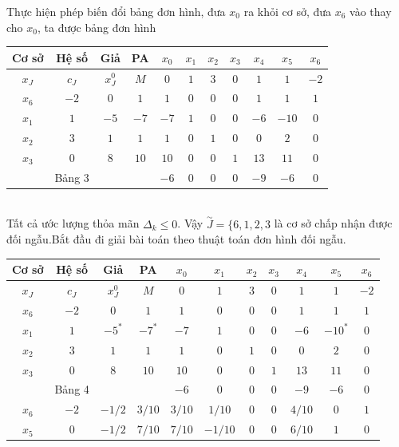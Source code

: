 \documentclass[12pt,a4paper]{report}
\begin{document}
\begin{itemize}
    Thực hiện phép biến đổi bảng đơn hình, đưa $x_0$ ra khỏi cơ sở, đưa $x_6$ vào thay cho $x_0$, ta được bảng đơn hình\\
    \begin{tabular}{|c|c|c|c|c|c|c|c|c|c|c|}
    \hline
         Cơ sở &Hệ số &Giả &PA &$x_0$&$x_1$ & $x_2$ &$x_3$ &$x_4$ & $x_5$ &$x_6$ \\
         \hline
         $x_J$ &$c_J$& $x_J^0$ &$M$ &$0$ &$1$ &$3$ &$0$ &$1$ &$1$ &$-2$\\
         \hline
         $x_6$&$-2$ &$0$ &$1$ &$1$ &$0$ &$0$ &$0$ &$1$ &$1$ &$1$ \\
         $x_1$& $1$ &$-5$ &$-7$ &$-7$ &$1$ &$0$ &$0$ &$-6$ &$-10$ &$0$\\
         $x_2$ &$3$ &$1$ &$1$ &$1$ &$0 $ &$1$ &$0$ &$0$ &$2$ &$0$\\
         $x_3$ &$0$ &$8$ &$10$ &$10$ &$0$ &$0$ &$1$ &$13$ &$11$ &$0$\\
         \hline
         &Bảng 3& &&$-6$ &$0$ &$0$ &$0$ &$-9$ &$-6$ &$0$\\
         \hline
    \end{tabular}\\
    Tất cả ước lượng thỏa mãn $\Delta_k \le 0$. Vậy $\overset{\sim}{J}=\{6,1,2,3$ là cơ sở chấp nhận được đối ngẫu.Bắt đầu đi giải bài toán theo thuật toán đơn hình đối ngẫu.\\
    \begin{tabular}{|c|c|c|c|c|c|c|c|c|c|c|}
    \hline
       Cơ sở   & Hệ số& Giả & PA&$x_0$&$x_1$ & $x_2$ & $x_3$ &$x_4$ &$x_5$ &$x_6$ \\
       \hline
        $x_J$  &$c_J$ &$x_J^0$ &$M$ &$0$ &$1$ &$3$ &$0$ &$1$ &$1$ &$-2$\\
        \hline
        $x_6$ &$-2$ &$0$ &$1$ &$1$ &$0$ &$0$ &$0$ &$1$ &$1$ &$1$\\
        $x_1$ &$1$ & $-5^*$ &$ -7^*$ &$-7$ & $1$ &$0$ &$0$ &$-6$ &$-10^*$ &$0$\\
        $x_2$ &$3$ &$1$ &$1$ &$1$  &$0$ &$1$ &$0$ &$0$ &$2$ &$0$\\
        $x_3$ &$0$ &$8$ &$10$ & $10$ &$0$ &$0$ &$1$ &$13$ &$11$  &$0$\\
        \hline
        & Bảng 4& & &$-6$ &$0$ &$0$ &$0$ &$-9$ &$-6$ &$0$\\
        \hline
        $x_6$ &$-2$ &$-1/2$ &$3/10$ &$3/10$ &$1/10$ &$0$ &$0$ &$4/10$ &$0$ &$1$\\
        $x_5$ &$0$ &$-1/2$ &$7/10$ &$7/10$ &$-1/10$ &$0$ &$0$ &$6/10$ &$1$ &$0$\\

\end{tabular}
\end{itemize}
\end{document}
